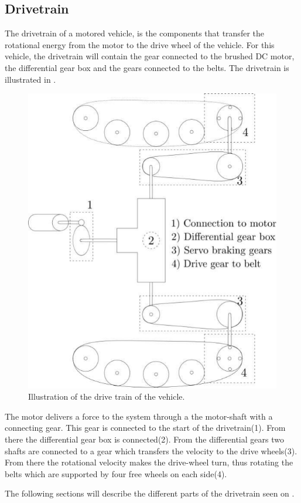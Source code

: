 \subsection{Drivetrain}
The drivetrain of a motored vehicle, is the components that transfer the rotational energy from the motor to the drive wheel of the vehicle. For this vehicle, the drivetrain will contain the gear connected to the brushed DC motor, the differential gear box and the gears connected to the belts. The drivetrain is illustrated in .

\begin{figure}[H]
	\centering
	\includegraphics[scale=1]{figures/vehicleDescriptionDriveTrain.pdf}
	\caption{Illustration of the drive train of the vehicle.}
	\label{vehicleDescriptionDriveTrain}
\end{figure}

The motor delivers a force to the system through a the motor-shaft with a connecting gear. This gear is connected to the start of the drivetrain(1). From there the differential gear box is connected(2). From the differential gears two shafts are connected to a gear which transfers the velocity to the drive wheels(3).
From there the rotational velocity makes the drive-wheel turn, thus rotating the belts which are supported by four free wheels on each side(4). 

The following sections will describe the different parts of the drivetrain seen on .\\ 